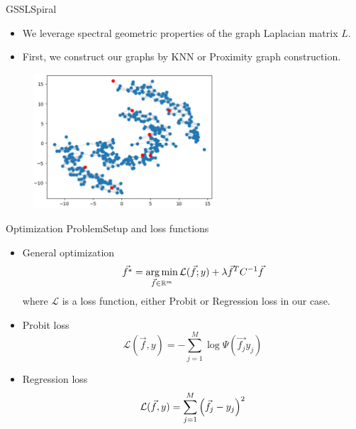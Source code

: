 	\begin{frame}{GSSL}{Spiral}
		\begin{itemize}
			\item We leverage spectral geometric properties of the graph Laplacian matrix $L$.
			\item First, we construct our graphs by KNN or Proximity graph construction.
		\end{itemize}
		\begin{figure}[H]
			\centering
			\hspace*{0cm}\includegraphics[width=0.6\textwidth,height=\textwidth,keepaspectratio]{Figures/SpiKNNRBF.png}
		\end{figure}
	\end{frame}

	\begin{frame}{Optimization Problem}{Setup and loss functions}
		\begin{itemize}
			\item General optimization
			\[\vec{f^*} = \operatorname*{arg\,min}_{\vec{f} \in \mathbb{R}^{m}} \mathcal{L}(\vec{f};y) + \lambda \vec{f}^{T}C^{-1}\vec{f}\]
			where $\mathcal{L}$ is a loss function, either Probit or Regression loss in our case.
			\item Probit loss
			\[
				\mathcal{L}(\vec{f},y) = - \sum_{j=1}^{M}\log \Psi (\vec{f_j}y_j)	
			\]
			\item Regression loss
			\[
				\mathcal{L}(\vec{f},y) = \sum_{j=1}^{M}{\left(\vec{f}_{j} - y_{j}\right)}^2
			\]
		\end{itemize}
	\end{frame}

